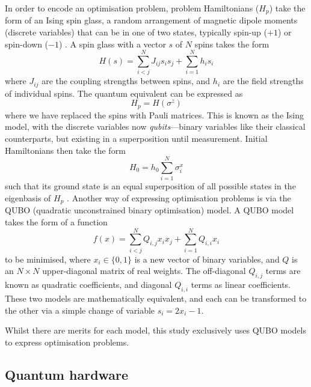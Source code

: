 \documentclass[12pt]{article}
\theoremstyle{definition}
\begin{document}
In order to encode an optimisation problem, problem Hamiltonians ($H_p$) take the form of an Ising spin glass, a random arrangement of magnetic dipole moments (discrete variables) that can be in one of two states, typically spin-up ($+1$) or spin-down ($-1$) \cite{lucas_ising_2014}. A spin glass with a vector $s$ of $N$ spins takes the form
\begin{equation}
    H(s) = \sum_{i<j}^{N}J_{ij}s_i s_j + \sum_{i=1}^{N}h_i s_i
    \label{eq:ising}
\end{equation}
where $J_{ij}$ are the coupling strengths between spins, and $h_i$ are the field strengths of individual spins. The quantum equivalent can be expressed as
\begin{equation}
    H_p = H(\sigma^z)
\end{equation}
where we have replaced the spins with Pauli matrices. This is known as the Ising model, with the discrete variables now \emph{qubits}---binary variables like their classical counterparts, but existing in a superposition until measurement. Initial Hamiltonians then take the form
\begin{equation}
    H_0 = h_0\sum_{i=1}^{N}\sigma_i^x
\end{equation}
such that its ground state is an equal superposition of all possible states in the eigenbasis of $H_p$ \cite{boixo_experimental_2013}.
Another way of expressing optimisation problems is via the QUBO (quadratic unconstrained binary optimisation) model. A QUBO model takes the form of a function
\begin{equation}
    f(x)=\sum^N_{i<j}Q_{i,j}x_ix_j + \sum^N_{i=1}Q_{i,i}x_i
    \label{eq:qubo}
\end{equation}
to be minimised, where $x_i\in\{0,1\}$ is a new vector of binary variables, and $Q$ is an $N\times N$ upper-diagonal matrix of real weights. The off-diagonal $Q_{i,j}$ terms are known as quadratic coefficients, and diagonal $Q_{i,i}$ terms as linear coefficients. These two models are mathematically equivalent, and each can be transformed to the other via a simple change of variable ${s_i = 2x_i - 1}$.

Whilst there are merits for each model, this study exclusively uses QUBO models to express optimisation problems.

\subsection{Quantum hardware}
\end{document}
